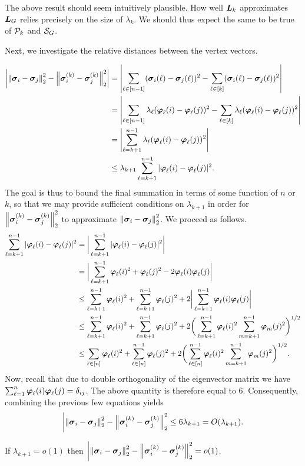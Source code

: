 \begin{remark}
	The  above result should seem intuitively plausible.  How  well $\L_k$ approximates $\L_G$ relies precisely on the size of $\lambda_k$. We should  thus expect  the same to be  true  of $\P_k$ and  $\splx_G$. 
\end{remark}


Next, we  investigate the relative distances between  the vertex vectors. 

\begin{align*}
\bigg| \norm{\sv_i-\sv_j}_2^2 - \norm{\sv_i^\k-\sv_j^\k}_2^2  \bigg| &= \left| \sum_{\ell\in[n-1]} (\sv_i(\ell)-\sv_j(\ell))^2  - \sum_{\ell\in[k]}(\sv_i(\ell) - \sv_j(\ell))^2 \right|\\ 
&= \left| \sum_{\ell\in[n-1]} \lambda_\ell(\vp_\ell(i)-\vp_\ell(j))^2  - \sum_{\ell\in[k]}\lambda_\ell(\vp_\ell(i) - \vp_\ell(j))^2 \right|\\ 
&=\left| \sum_{\ell=k+1}^{n-1} \lambda_\ell(\vp_\ell(i)-\vp_\ell(j))^2 \right|\\ 
&\leq \lambda_{k+1} \sum_{\ell=k+1}^{n-1} |\vp_\ell(i)-\vp_\ell(j)|^2.
\end{align*}
The  goal is  thus to bound the final summation in  terms of some function of $n$ or $k$, so that we may provide sufficient conditions on $\lambda_{k+1}$ in order for $\norm{\sv_i^\k-\sv_j^\k}_2^2$ to approximate $\norm{\sv_i-\sv_j}_2^2$. We proceed as follows. 
\begin{align*}
\sum_{\ell=k+1}^{n-1} |\vp_\ell(i)-\vp_\ell(j)|^2 &= \bigg|\sum_{\ell=k+1}^{n-1} |\vp_\ell(i)-\vp_\ell(j)|^2\bigg| \\
&= \bigg|\sum_{\ell={k+1}}^{n-1} \vp_\ell(i)^2 + \vp_\ell(j)^2 - 2\vp_\ell(i)\vp_\ell(j) \bigg|\\
&\leq \sum_{\ell=k+1}^{n-1} \vp_\ell(i)^2 + \sum_{\ell=k+1}^{n-1} \vp_\ell(j)^2 + 2\bigg|\sum_{\ell=k+1}^{n-1} \vp_\ell(i)\vp_\ell(j)\bigg| \\
&\leq \sum_{\ell=k+1}^{n-1} \vp_\ell(i)^2 + \sum_{\ell=k+1}^{n-1} \vp_\ell(j)^2 + 2\bigg(\sum_{\ell=k+1}^{n-1}\vp_\ell(i)^2\sum_{m=k+1}^{n-1}\vp_m(j)^2\bigg) ^{1/2} \\
&\leq \sum_{\ell\in[n]} \vp_\ell(i)^2 + \sum_{\ell\in[n]}^{n-1} \vp_\ell(j)^2 + 2\bigg(\sum_{\ell\in[n]}^{n-1}\vp_\ell(i)^2\sum_{m=k+1}^{n-1}\vp_m(j)^2\bigg) ^{1/2}. 
\end{align*} 
Now,  recall that due to double orthogonality of the eigenvector matrix we  have $\sum_{\ell=1}^n \vp_\ell(i)\vp_\ell(j) = \delta_{ij}$.  The above quantity is therefore  equal to 6. Consequently, combining the previous few equations yields 
\begin{equation*}
\bigg| \norm{\sv_i-\sv_j}_2^2 - \norm{\sv_i^\k-\sv_j^\k}_2^2\leq 6\lambda_{k+1}=O(\lambda_{k+1}). 
\end{equation*}

\begin{lemma}
	If $\lambda_{k+1}=o(1)$ then $\bigg| \norm{\sv_i-\sv_j}_2^2 - \norm{\sv_i^\k-\sv_j^\k}_2^2= o(1)$. 
\end{lemma}







